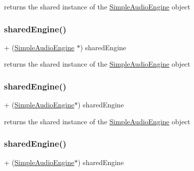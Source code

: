 returns the shared instance of the \hyperlink{interfaceSimpleAudioEngine}{Simple\+Audio\+Engine} object \mbox{\label{interfaceSimpleAudioEngine_aa571a8e565bfe5153919b3151d9f26f4}} 
\subsubsection{\texorpdfstring{shared\+Engine()}{sharedEngine()}\hspace{0.1cm}{\footnotesize\ttfamily [2/4]}}
{\footnotesize\ttfamily + (\hyperlink{interfaceSimpleAudioEngine}{Simple\+Audio\+Engine} $\ast$) shared\+Engine \begin{DoxyParamCaption}{ }\end{DoxyParamCaption}}

returns the shared instance of the \hyperlink{interfaceSimpleAudioEngine}{Simple\+Audio\+Engine} object \mbox{\label{interfaceSimpleAudioEngine_ac1b5d38a6da0e40254f29dd992bad73c}} 
\subsubsection{\texorpdfstring{shared\+Engine()}{sharedEngine()}\hspace{0.1cm}{\footnotesize\ttfamily [3/4]}}
{\footnotesize\ttfamily + (\hyperlink{interfaceSimpleAudioEngine}{Simple\+Audio\+Engine}$\ast$) shared\+Engine \begin{DoxyParamCaption}{ }\end{DoxyParamCaption}}

returns the shared instance of the \hyperlink{interfaceSimpleAudioEngine}{Simple\+Audio\+Engine} object \mbox{\label{interfaceSimpleAudioEngine_ac1b5d38a6da0e40254f29dd992bad73c}} 
\subsubsection{\texorpdfstring{shared\+Engine()}{sharedEngine()}\hspace{0.1cm}{\footnotesize\ttfamily [4/4]}}
{\footnotesize\ttfamily + (\hyperlink{interfaceSimpleAudioEngine}{Simple\+Audio\+Engine}$\ast$) shared\+Engine \begin{DoxyParamCaption}{ }\end{DoxyParamCaption}}

